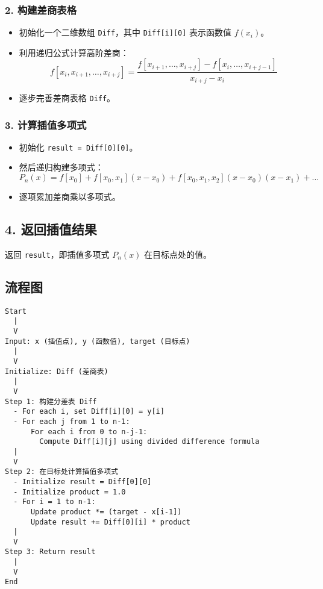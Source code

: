 \documentclass[a4paper]{article}
\begin{document}
\subsubsection*{2. 构建差商表格}
\begin{itemize}
    \item 初始化一个二维数组 \texttt{Diff}，其中 \texttt{Diff[i][0]} 表示函数值 $f(x_i)$。
    \item 利用递归公式计算高阶差商：
    \[
    f[x_i, x_{i+1}, \dots, x_{i+j}] = \frac{f[x_{i+1}, \dots, x_{i+j}] - f[x_i, \dots, x_{i+j-1}]}{x_{i+j} - x_i}
    \]
    \item 逐步完善差商表格 \texttt{Diff}。
\end{itemize}

\subsubsection*{3. 计算插值多项式}
\begin{itemize}
    \item 初始化 \texttt{result = Diff[0][0]}。
    \item 然后递归构建多项式：
    \[
    P_n(x) = f[x_0] + f[x_0, x_1](x - x_0) + f[x_0, x_1, x_2](x - x_0)(x - x_1) + \dots
    \]
    \item 逐项累加差商乘以多项式。
\end{itemize}

\subsection*{4. 返回插值结果}
返回 \texttt{result}，即插值多项式 $P_n(x)$ 在目标点处的值。

\subsection*{流程图}

\begin{verbatim}
Start
  |
  V
Input: x (插值点), y (函数值), target (目标点)
  |
  V
Initialize: Diff (差商表)
  |
  V
Step 1: 构建分差表 Diff
  - For each i, set Diff[i][0] = y[i]
  - For each j from 1 to n-1:
      For each i from 0 to n-j-1:
        Compute Diff[i][j] using divided difference formula
  |
  V
Step 2: 在目标处计算插值多项式
  - Initialize result = Diff[0][0]
  - Initialize product = 1.0
  - For i = 1 to n-1:
      Update product *= (target - x[i-1])
      Update result += Diff[0][i] * product
  |
  V
Step 3: Return result
  |
  V
End
\end{verbatim}
\end{document}
